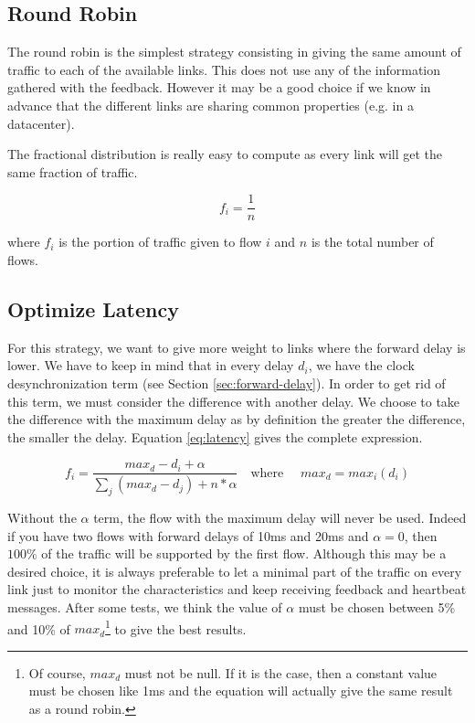 \subsection{Round Robin}

The round robin is the simplest strategy consisting in giving the same amount of traffic to each of the available links. This does not use any of the information gathered with the feedback. However it may be a good choice if we know in advance that the different links are sharing common properties (e.g. in a datacenter).

The fractional distribution is really easy to compute as every link will get the same fraction of traffic.

\begin{equation*}
f_i = \frac{1}{n}
\end{equation*}

where $f_i$ is the portion of traffic given to flow $i$ and $n$ is the total number of flows.

\subsection{Optimize Latency}

For this strategy, we want to give more weight to links where the forward delay is lower. We have to keep in mind that in every delay $d_i$, we have the clock desynchronization term (see Section \ref{sec:forward-delay}). In order to get rid of this term, we must consider the difference with another delay. We choose to take the difference with the maximum delay as by definition the greater the difference, the smaller the delay. Equation \ref{eq:latency} gives the complete expression.  

\begin{equation}
f_i = \frac{max_d - d_i + \alpha}{\sum_j (max_d - d_j) + n*\alpha }\quad \text{where } \quad max_d = max_i(d_i) 
\label{eq:latency}
\end{equation}

Without the $\alpha$ term, the flow with the maximum delay will never be used. Indeed if you have two flows with forward delays of 10ms and 20ms and $\alpha=0$, then $100\%$ of the traffic will be supported by the first flow. Although this may be a desired choice, it is always preferable to let a minimal part of the traffic on every link just to monitor the characteristics and keep receiving feedback and heartbeat messages. After some tests, we think the value of $\alpha$ must be chosen between 5\% and 10\% of $max_d$\footnote{Of course, $max_d$ must not be null. If it is the case, then a constant value must be chosen like 1ms and the equation will actually give the same result as a round robin.} to give the best results. 

